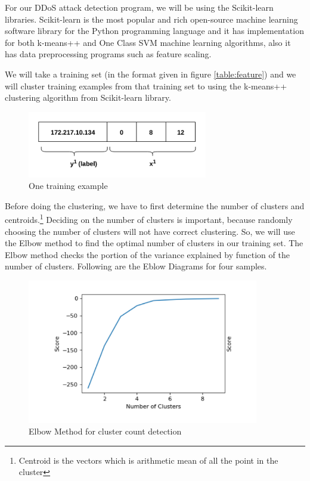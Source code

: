 \documentclass[12pt,oneside,a4paper]{article}
\begin{document}
For our DDoS attack detection program, we will be using the Scikit-learn libraries. Scikit-learn is the most popular and rich open-source machine learning software library for the Python programming language and it has implementation for both k-means++ and One Class SVM machine learning algorithms, also it has data preprocessing programs such as feature scaling.

We will take a training set (in the format given in figure \ref{table:feature}) and we will cluster training examples from that training set to using the k-means++ clustering algorithm from Scikit-learn library.

\begin{figure}[H]
\centering
\includegraphics[width=0.70\textwidth]{training_example.png}
\caption{One training example} \label{fig:training_example}
\end{figure}

Before doing the clustering, we have to first determine the number of clusters and centroids.\footnote{Centroid is the vectors which is arithmetic mean of all the point in the cluster} Deciding on the number of clusters is important, because randomly choosing the number of clusters will not have correct clustering. So, we will use the Elbow method to find the optimal number of clusters in our training set. The Elbow method checks the portion of the variance explained by function of the number of clusters. Following are the Eblow Diagrams for four samples.

\begin{figure}[H]
\centering
\includegraphics[width=0.90\textwidth]{elbow-method.png}
\caption{Elbow Method for cluster count detection} \label{fig:elbow-method}
\end{figure}
\end{document}
